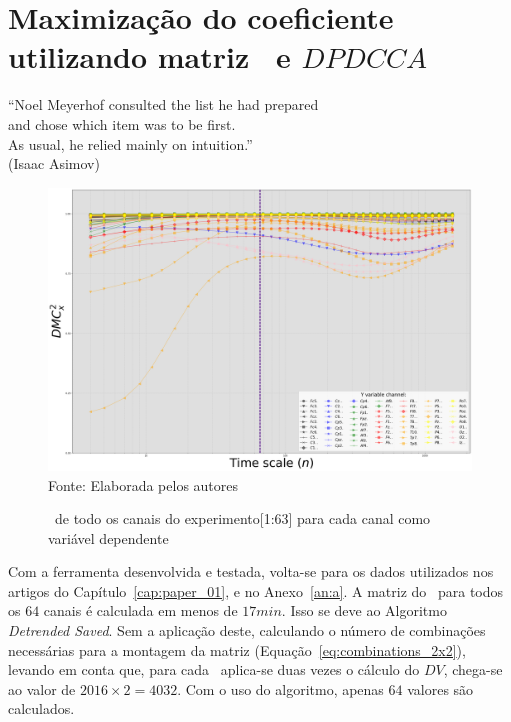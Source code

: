 \chapter{ Maximização do coeficiente \dmc utilizando matriz \pdcca~e $DPDCCA$}\label{cap:paper_03}



\begin{flushright}
    ``Noel Meyerhof consulted the list he had prepared \\
    and chose which item was to be first. \\
    As usual, he relied mainly on intuition.''\\[10px]
    (Isaac Asimov)
    \end{flushright}



\begin{figure}[!htb]
	\centering
	\caption{\dmc~de todo os canais do experimento[1:63] para cada canal como variável dependente}
	\includegraphics[width=.95\textwidth]{./Figures/art_03/dmc_all.png}
	\\{\footnotesize Fonte: Elaborada pelos autores}
	\label{fig:a03_dmc_total}
\end{figure}

Com a ferramenta desenvolvida e testada, volta-se para os dados utilizados nos artigos do Capítulo~\ref{cap:paper_01}, e no Anexo~\ref{an:a}. A matriz do \pdcca~para todos os $64$ canais é calculada em menos de $17min$. Isso se deve ao Algoritmo \emph{Detrended Saved}. Sem a aplicação deste, calculando o número de combinações necessárias para a montagem da matriz (Equação~\ref{eq:combinations_2x2}), levando em conta que, para cada \dcca~aplica-se duas vezes o cálculo do $DV$, chega-se ao valor de $2016 \times 2 = 4032$. Com o uso do algoritmo, apenas $64$ valores são calculados.

